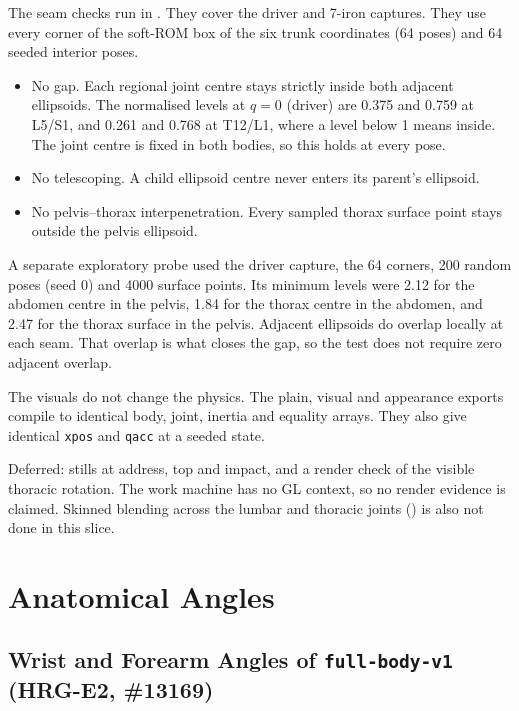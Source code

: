 \documentclass[11pt,a4paper]{article}
\begin{document}
The seam checks run in
. They
cover the driver and 7-iron captures. They use every corner of the soft-ROM
box of the six trunk coordinates (64 poses) and 64 seeded interior poses.
\begin{itemize}
\item No gap. Each regional joint centre stays strictly inside both adjacent
  ellipsoids. The normalised levels at $q=0$ (driver) are 0.375 and 0.759 at
  L5/S1, and 0.261 and 0.768 at T12/L1, where a level below 1 means inside.
  The joint centre is fixed in both bodies, so this holds at every pose.
\item No telescoping. A child ellipsoid centre never enters its parent's
  ellipsoid.
\item No pelvis--thorax interpenetration. Every sampled thorax surface point
  stays outside the pelvis ellipsoid.
\end{itemize}
A separate exploratory probe used the driver capture, the 64 corners, 200
random poses (seed 0) and 4000 surface points. Its minimum levels were 2.12
for the abdomen centre in the pelvis, 1.84 for the thorax centre in the
abdomen, and 2.47 for the thorax surface in the pelvis.
Adjacent ellipsoids do overlap locally at each seam. That overlap is what
closes the gap, so the test does not require zero adjacent overlap.

The visuals do not change the physics. The plain, visual and appearance
exports compile to identical body, joint, inertia and equality arrays. They
also give identical \texttt{xpos} and \texttt{qacc} at a seeded state.

Deferred: stills at address, top and impact, and a render check of the
visible thoracic rotation. The work machine has no GL context, so no render
evidence is claimed. Skinned blending across the lumbar and thoracic joints
() is also not done in this slice.

\section{Anatomical Angles}
\label{sec:angles}

\subsection{Wrist and Forearm Angles of \texttt{full-body-v1} (HRG-E2, \#13169)}
\end{document}
